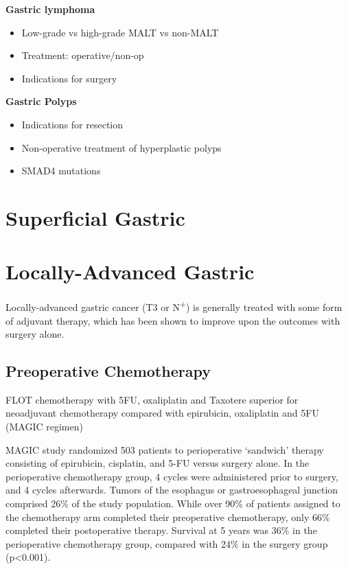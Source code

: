 \documentclass[
]{book}
\providecommand{\tightlist}{%
  \setlength{\itemsep}{0pt}\setlength{\parskip}{0pt}}
\begin{document}
\textbf{Gastric lymphoma}

\begin{itemize}
\tightlist
\item
  Low-grade vs high-grade MALT vs non-MALT
\item
  Treatment: operative/non-op
\item
  Indications for surgery
\end{itemize}

\textbf{Gastric Polyps}

\begin{itemize}
\tightlist
\item
  Indications for resection
\item
  Non-operative treatment of hyperplastic polyps
\item
  SMAD4 mutations
\end{itemize}

\hypertarget{gast_superficial}{%
\chapter{Superficial Gastric}\label{gast_superficial}}

\hypertarget{locally-advanced-gastric}{%
\chapter{Locally-Advanced Gastric}\label{locally-advanced-gastric}}

Locally-advanced gastric cancer (T3 or N\textsuperscript{+}) is generally treated with some form of adjuvant therapy, which has been shown to improve upon the outcomes with surgery alone.

\hypertarget{preoperative-chemotherapy}{%
\section{Preoperative Chemotherapy}\label{preoperative-chemotherapy}}

FLOT chemotherapy \citep{al-batran1948} with 5FU, oxaliplatin and Taxotere superior for neoadjuvant chemotherapy compared with epirubicin, oxaliplatin and 5FU (MAGIC regimen)

MAGIC study randomized 503 patients to perioperative `sandwich' therapy consisting of epirubicin, cisplatin, and 5-FU versus surgery alone. In the perioperative chemotherapy group, 4 cycles were administered prior to surgery, and 4 cycles afterwards. Tumors of the esophagus or gastroesophageal junction comprised 26\% of the study population. While over 90\% of patients assigned to the chemotherapy arm completed their preoperative chemotherapy, only 66\% completed their postoperative therapy. Survival at 5 years was 36\% in the perioperative chemotherapy group, compared with 24\% in the surgery group (p\textless0.001).\citep{cunningham11}
\end{document}
